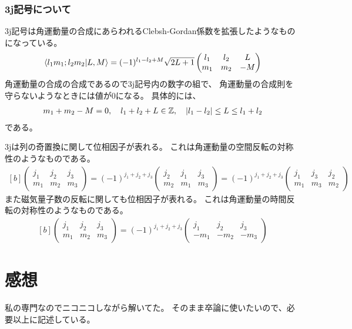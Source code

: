 \documentclass[../ap_2011.tex]{subfiles}
\begin{document}
\subsubsection*{3j記号について}
3j記号は角運動量の合成にあらわれるClebsh-Gordan係数を拡張したようなものになっている。
\begin{equation}\begin{aligned}[b]
    \bra{l_1m_1;l_2m_2}\ket{L,M}=(-1)^{l_1-l_2+M}\sqrt{2L+1}\begin{pmatrix}
        l_1 &l_2&L\\
        m_1 &m_2&-M
    \end{pmatrix}
\end{aligned}\end{equation}
角運動量の合成の合成であるので3j記号内の数字の組で、
角運動量の合成則を守らないようなときには値が0になる。
具体的には、
\begin{equation}\begin{aligned}[b]
    m_1+m_2-M=0,\quad l_1+l_2+L \in \mathbb{Z},\quad \abs{l_1-l_2}\leq L \leq l_1+l_2
\end{aligned}\end{equation}
である。

3jは列の奇置換に関して位相因子が表れる。
これは角運動量の空間反転の対称性のようなものである。
\begin{equation}\begin{aligned}[b]
    \begin{pmatrix}
        j_1 & j_2 & j_3\\
        m_1 & m_2 & m_3
    \end{pmatrix}
    =(-1)^{j_1+j_2+j_3}\begin{pmatrix}
        j_2 & j_1 & j_3\\
        m_2 & m_1 & m_3
    \end{pmatrix}=(-1)^{j_1+j_2+j_3}\begin{pmatrix}
        j_1 & j_3 & j_2\\
        m_1 & m_3 & m_2
    \end{pmatrix}
\end{aligned}\end{equation}
また磁気量子数の反転に関しても位相因子が表れる。
これは角運動量の時間反転の対称性のようなものである。
\begin{equation}\begin{aligned}[b]
    \begin{pmatrix}
        j_1 & j_2 & j_3\\
        m_1 & m_2 & m_3
    \end{pmatrix}
    =(-1)^{j_1+j_2+j_3}\begin{pmatrix}
        j_1 & j_2 & j_3\\
        -m_1 & -m_2 & -m_3
    \end{pmatrix}
\end{aligned}\end{equation}


\section*{感想}
私の専門なのでニコニコしながら解いてた。
そのまま卒論に使いたいので、必要以上に記述している。
\end{document}
